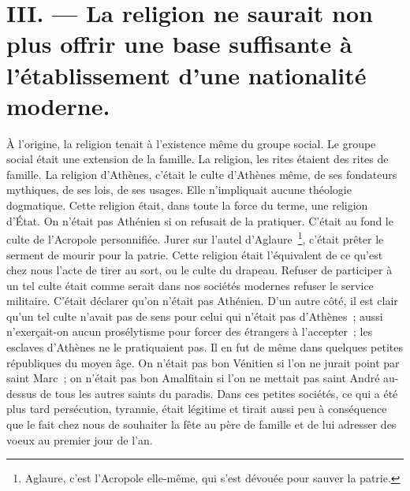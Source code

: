 \documentclass[french,twoside]{book} %
\newcommand\persName[1]{#1}
\newcommand\placeName[1]{#1}
\begin{document}
\section[{III. — La religion ne saurait non plus offrir une base suffisante à l’établissement d’une nationalité moderne.}]{III. — La religion ne saurait non plus offrir une base suffisante à l’établissement d’une nationalité moderne.}
\noindent À l’origine, la religion tenait à l’existence même du groupe social. Le groupe social était une extension de la famille. La religion, les rites étaient des rites de famille. La religion d’{\placeName Athènes}, c’était le culte d’{\placeName Athènes} même, de ses fondateurs mythiques, de ses lois, de ses usages. Elle n’impliquait aucune théologie dogmatique. Cette religion était, dans toute la force du terme, une religion d’État. On n’était pas Athénien si on refusait de la pratiquer. C’était au fond le culte de l’Acropole personnifiée. Jurer sur l’autel d’{\persName Aglaure} \footnote{{\persName Aglaure}, c’est l’Acropole elle-même, qui s’est dévouée pour sauver la patrie.}, c’était prêter le serment de mourir pour la patrie. Cette religion était l’équivalent de ce qu’est chez nous l’acte de tirer au sort, ou le culte du drapeau. Refuser de participer à un tel culte était comme serait dans nos sociétés modernes refuser le service militaire. C’était déclarer qu’on n’était pas Athénien. D’un autre côté, il est clair qu’un tel culte n’avait pas de sens pour celui qui n’était pas d’{\placeName Athènes} ; aussi n’exerçait-on aucun prosélytisme pour forcer des étrangers à l’accepter ; les esclaves d’{\placeName Athènes} ne le pratiquaient pas. Il en fut de même dans quelques petites républiques du moyen âge. On n’était pas bon Vénitien si l’on ne jurait point par {\persName saint Marc} ; on n’était pas bon Amalfitain si l’on ne mettait pas {\persName saint André} au-dessus de tous les autres saints du paradis. Dans ces petites sociétés, ce qui a été plus tard persécution, tyrannie, était légitime et tirait aussi peu à conséquence que le fait chez nous de souhaiter la fête au père de famille et de lui adresser des voeux au premier jour de l’an.\par
\end{document}
